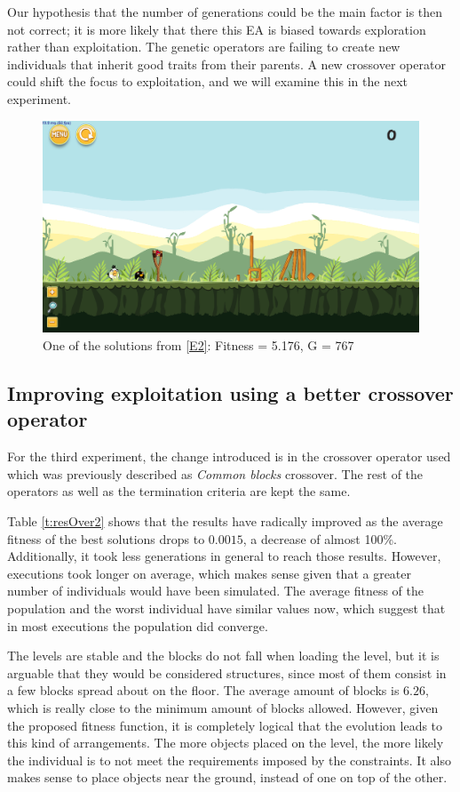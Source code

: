 \documentclass[a4paper,twoside]{article}
\begin{document}
Our hypothesis that the number of generations could be the main factor
is then not correct; it is more likely that there this EA is biased towards 
exploration rather than exploitation. The genetic operators are failing to 
create new individuals that inherit good traits from their parents. A new 
crossover operator could shift the focus to exploitation, and we will
examine this in the next experiment.
\begin{figure}
	\centering
	\includegraphics[scale=0.2]{level-0-base_large180529_223045.png}
	\caption{One of the solutions from \ref{E2}: Fitness = 5.176, G = 767  }\label{f:e2-4}
\end{figure}
\subsection{Improving exploitation using a better crossover operator}\label{E3}

For the third experiment, the change introduced is in the crossover operator 
used which was previously described as \textit{Common blocks} crossover. 
The rest of the operators as 
well as the termination criteria are kept the same. 

Table \ref{t:resOver2} shows that the results have radically improved as the 
average fitness of the best solutions drops to $0.0015$, a decrease of almost 
100\%. Additionally, it took less generations in general to reach those 
results. However, executions took longer on average, which makes sense given 
that a greater number of individuals would have been simulated. The average 
fitness of the population and the worst individual have similar values now, 
which suggest that in most executions the population did converge.

The levels are stable and the blocks do not fall when loading the level, but 
it is arguable that they would be considered structures, since most of them consist in a 
few blocks spread about on the floor.%
The average amount of blocks is $6.26$, 
which is really close to the minimum amount of blocks allowed. However, given 
the proposed fitness function, it is completely logical that the evolution 
leads to this kind of arrangements. The more objects placed on the level, the 
more likely the individual is to not meet the requirements imposed by the 
constraints. It also makes sense to place objects near the ground, instead of 
one on top of the other.
\end{document}
